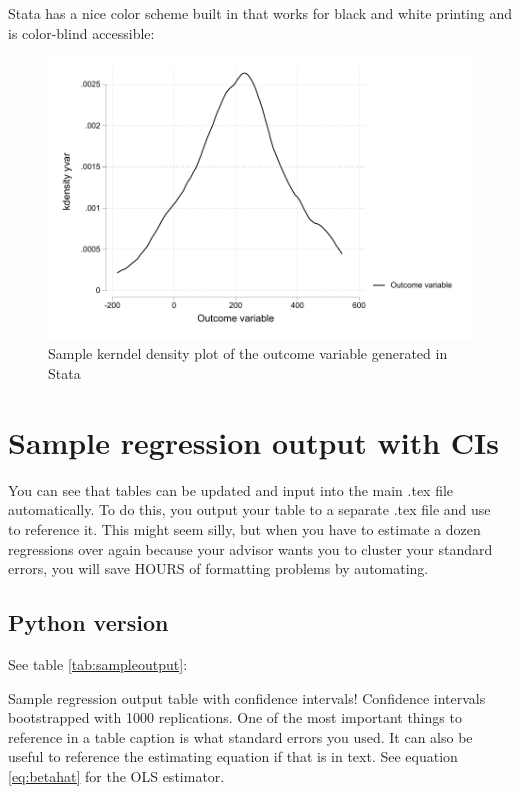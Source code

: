 \documentclass{article}
\begin{document}
Stata has a nice color scheme built in that works for black and white printing and is color-blind accessible:

\begin{figure}[ht]
    \centering
    \includegraphics{homework1/output/statadensity.pdf}
    \caption{Sample kerndel density plot of the outcome variable generated in Stata}
    \label{fig:statahist}
\end{figure}

\section{Sample regression output with CIs}
You can see that tables can be updated and input into the main .tex file automatically.  To do this, you output your table to a separate .tex file and use \verb!  ! to reference it.  This might seem silly, but when you have to estimate a dozen regressions over again because your advisor wants you to cluster your standard errors, you will save HOURS of formatting problems by automating.

\subsection{Python version}

See table \ref{tab:sampleoutput}:

\begin{table}[ht]
    \centering
    
    \caption{Sample regression output table with confidence intervals! Confidence intervals bootstrapped with 1000 replications.  One of the most important things to reference in a table caption is what standard errors you used.  It can also be useful to reference the estimating equation if that is in text. See equation \ref{eq:betahat} for the OLS estimator.}
    \label{tab:sampleoutput}
\end{table}
\end{document}
